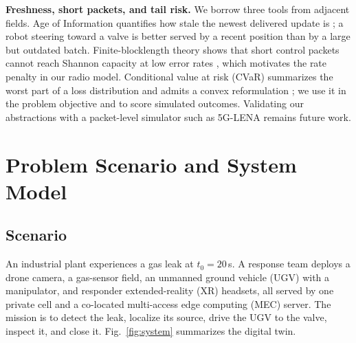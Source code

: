 \documentclass[conference]{IEEEtran}
\newcommand{\figref}[1]{Fig.~\ref{#1}}
\begin{document}
\textbf{Freshness, short packets, and tail risk.} We borrow three tools from adjacent fields. Age of Information quantifies how stale the newest delivered update is \cite{kaul,aoi}; a robot steering toward a valve is better served by a recent position than by a large but outdated batch. Finite-blocklength theory shows that short control packets cannot reach Shannon capacity at low error rates \cite{polyanskiy}, which motivates the rate penalty in our radio model. Conditional value at risk (CVaR) summarizes the worst part of a loss distribution and admits a convex reformulation \cite{cvar}; we use it in the problem objective and to score simulated outcomes. Validating our abstractions with a packet-level simulator such as 5G-LENA \cite{lena} remains future work.

\section{Problem Scenario and System Model}\label{sec:model}
\subsection{Scenario}
An industrial plant experiences a gas leak at $t_0=20$\,s. A response team deploys a drone camera, a gas-sensor field, an unmanned ground vehicle (UGV) with a manipulator, and responder extended-reality (XR) headsets, all served by one private cell and a co-located multi-access edge computing (MEC) server. The mission is to detect the leak, localize its source, drive the UGV to the valve, inspect it, and close it. \figref{fig:system} summarizes the digital twin.
\end{document}
